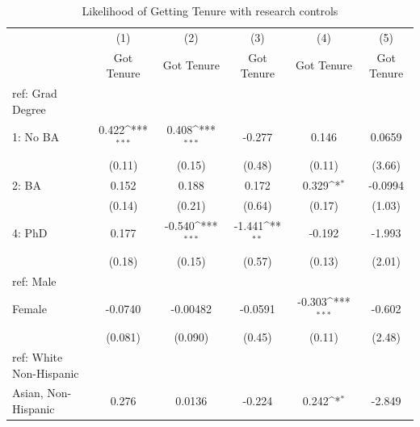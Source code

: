 \begin{table}[htbp]\centering
\def\sym#1{\ifmmode^{#1}\else\(^{#1}\)\fi}
\caption{Likelihood of Getting Tenure with research controls \label{tab1}}
\begin{tabular}{l*{5}{c}}
\hline\hline
  &\multicolumn{1}{c}{(1)}&\multicolumn{1}{c}{(2)}&\multicolumn{1}{c}{(3)}&\multicolumn{1}{c}{(4)}&\multicolumn{1}{c}{(5)}\\
  &\multicolumn{1}{c}{Got Tenure}&\multicolumn{1}{c}{Got Tenure}&\multicolumn{1}{c}{Got Tenure}&\multicolumn{1}{c}{Got Tenure}&\multicolumn{1}{c}{Got Tenure}\\
\hline
ref: Grad Degree&                     &                     &                     &                     &                     \\
[1em]
1: No BA&       0.422\sym{***}&       0.408\sym{***}&      -0.277         &       0.146         &      0.0659         \\
  &      (0.11)         &      (0.15)         &      (0.48)         &      (0.11)         &      (3.66)         \\
[1em]
2: BA&       0.152         &       0.188         &       0.172         &       0.329\sym{*}  &     -0.0994         \\
  &      (0.14)         &      (0.21)         &      (0.64)         &      (0.17)         &      (1.03)         \\
[1em]
4: PhD&       0.177         &      -0.540\sym{***}&      -1.441\sym{**} &      -0.192         &      -1.993         \\
  &      (0.18)         &      (0.15)         &      (0.57)         &      (0.13)         &      (2.01)         \\
[1em]
ref: Male&                     &                     &                     &                     &                     \\
[1em]
Female&     -0.0740         &    -0.00482         &     -0.0591         &      -0.303\sym{***}&      -0.602         \\
  &     (0.081)         &     (0.090)         &      (0.45)         &      (0.11)         &      (2.48)         \\
[1em]
ref: White Non-Hispanic&                     &                     &                     &                     &                     \\
[1em]
Asian, Non-Hispanic&       0.276         &      0.0136         &      -0.224         &       0.242\sym{*}  &      -2.849         \\

\end{tabular}
\end{table}
